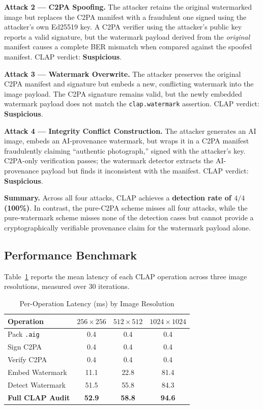 \documentclass[conference]{IEEEtran}
\begin{document}
\textbf{Attack 2 — C2PA Spoofing.}
The attacker retains the original watermarked image but replaces the
C2PA manifest with a fraudulent one signed using the attacker's own
Ed25519 key.
A C2PA verifier using the attacker's public key reports a valid signature,
but the watermark payload derived from the \textit{original} manifest
causes a complete BER mismatch when compared against the spoofed manifest.
CLAP verdict: \textbf{Suspicious}.

\textbf{Attack 3 — Watermark Overwrite.}
The attacker preserves the original C2PA manifest and signature but
embeds a new, conflicting watermark into the image payload.
The C2PA signature remains valid, but the newly embedded watermark
payload does not match the \texttt{clap.watermark} assertion.
CLAP verdict: \textbf{Suspicious}.

\textbf{Attack 4 — Integrity Conflict Construction.}
The attacker generates an AI image, embeds an AI-provenance watermark,
but wraps it in a C2PA manifest fraudulently claiming ``authentic
photograph,'' signed with the attacker's key.
C2PA-only verification passes; the watermark detector extracts the
AI-provenance payload but finds it inconsistent with the manifest.
CLAP verdict: \textbf{Suspicious}.

\textbf{Summary.}
Across all four attacks, CLAP achieves a \textbf{detection rate of
$4/4$ (100\%)}.
In contrast, the pure-C2PA scheme misses all four attacks, while the
pure-watermark scheme misses none of the detection cases but cannot
provide a cryptographically verifiable provenance claim for the watermark
payload alone.

\subsection{Performance Benchmark}

Table~\ref{tab:performance} reports the mean latency of each CLAP
operation across three image resolutions, measured over 30 iterations.

\begin{table}[ht]
\centering
\caption{Per-Operation Latency (ms) by Image Resolution}
\label{tab:performance}
\begin{tabular}{|l|c|c|c|}
\hline
\textbf{Operation} & \textbf{$256{\times}256$} &
\textbf{$512{\times}512$} & \textbf{$1024{\times}1024$} \\
\hline
Pack \texttt{.aig}      & 0.4  & 0.4  & 0.4  \\
Sign C2PA               & 0.4  & 0.4  & 0.4  \\
Verify C2PA             & 0.4  & 0.4  & 0.4  \\
Embed Watermark         & 11.1 & 22.8 & 81.4 \\
Detect Watermark        & 51.5 & 55.8 & 84.3 \\
\textbf{Full CLAP Audit} & \textbf{52.9} & \textbf{58.8} & \textbf{94.6} \\
\hline
\end{tabular}
\end{table}
\end{document}
